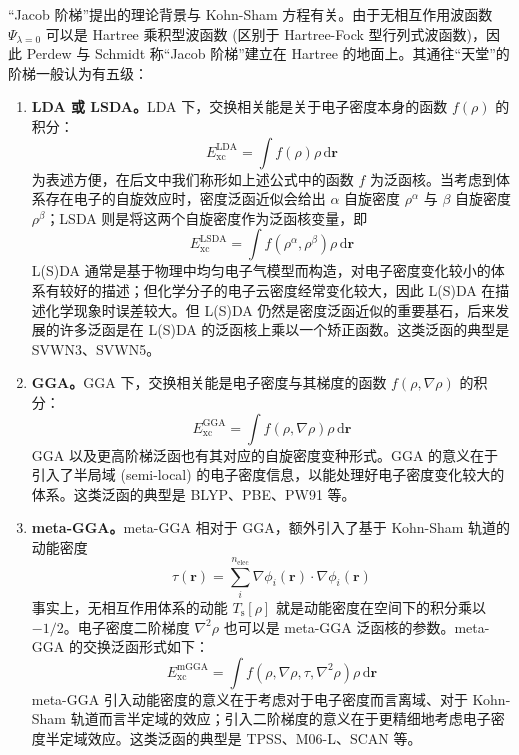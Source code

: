 “Jacob 阶梯”提出的理论背景与 Kohn-Sham 方程有关。由于无相互作用波函数 $\Psi_{\lambda = 0}$ 可以是 Hartree 乘积型波函数 (区别于 Hartree-Fock 型行列式波函数)，因此 Perdew 与 Schmidt 称“Jacob 阶梯”建立在 Hartree 的地面上。其通往“天堂”的阶梯一般认为有五级：
\begin{enumerate}[nosep]
  \item \textbf{LDA 或 LSDA。}LDA 下，交换相关能是关于电子密度本身的函数 $f(\rho)$ 的积分：
  \begin{equation}
    E_\mathrm{xc}^\mathrm{LDA} = \int f(\rho) \rho \, \mathrm{d} \bm{r}
  \end{equation}
  为表述方便，在后文中我们称形如上述公式中的函数 $f$ 为泛函核。当考虑到体系存在电子的自旋效应时，密度泛函近似会给出 $\alpha$ 自旋密度 $\rho^\alpha$ 与 $\beta$ 自旋密度 $\rho^\beta$；LSDA 则是将这两个自旋密度作为泛函核变量，即
  \begin{equation}
    E_\mathrm{xc}^\mathrm{LSDA} = \int f(\rho^\alpha, \rho^\beta) \rho \, \mathrm{d} \bm{r}
  \end{equation}
  L(S)DA 通常是基于物理中均匀电子气模型而构造，对电子密度变化较小的体系有较好的描述；但化学分子的电子云密度经常变化较大，因此 L(S)DA 在描述化学现象时误差较大。但 L(S)DA 仍然是密度泛函近似的重要基石，后来发展的许多泛函是在 L(S)DA 的泛函核上乘以一个矫正函数。这类泛函的典型是 SVWN3\cite{Dirac-Dirac.MPCPS.1930, Bloch-Bloch.ZP.1929, Vosko-Nusair.CJP.1980}、SVWN5\cite{Dirac-Dirac.MPCPS.1930, Bloch-Bloch.ZP.1929, Vosko-Nusair.CJP.1980}。
  
  \item \textbf{GGA。}GGA 下，交换相关能是电子密度与其梯度的函数 $f(\rho, \nabla \rho)$ 的积分：
  \begin{equation}
    E_\mathrm{xc}^\mathrm{GGA} = \int f(\rho, \nabla \rho) \rho \, \mathrm{d} \bm{r}
  \end{equation}
  GGA 以及更高阶梯泛函也有其对应的自旋密度变种形式。GGA 的意义在于引入了半局域 (semi-local) 的电子密度信息，以能处理好电子密度变化较大的体系。这类泛函的典型是 BLYP\cite{Becke-Becke.PRA.1988, Lee-Parr.PRB.1988}、PBE\cite{Perdew-Ernzerhof.PRL.1996}、PW91\cite{Perdew-Fiolhais.PRB.1992} 等。

  \item \textbf{meta-GGA。}meta-GGA 相对于 GGA，额外引入了基于 Kohn-Sham 轨道的动能密度
  \begin{equation*}
    \tau (\bm{r}) = \sum_i^{n_\mathrm{elec}} \nabla \phi_i (\bm{r}) \cdot \nabla \phi_i (\bm{r})
  \end{equation*}
  事实上，无相互作用体系的动能 $T_\mathrm{s} [\rho]$ 就是动能密度在空间下的积分乘以 $-1/2$。电子密度二阶梯度 $\nabla^2 \rho$ 也可以是 meta-GGA 泛函核的参数。meta-GGA 的交换泛函形式如下：
  \begin{equation}
    E_\mathrm{xc}^\mathrm{mGGA} = \int f(\rho, \nabla \rho, \tau, \nabla^2 \rho) \rho \, \mathrm{d} \bm{r}
  \end{equation}
  meta-GGA 引入动能密度的意义在于考虑对于电子密度而言离域、对于 Kohn-Sham 轨道而言半定域的效应；引入二阶梯度的意义在于更精细地考虑电子密度半定域效应。这类泛函的典型是 TPSS\cite{Tao-Scuseria.PRL.2003, Perdew-Scuseria.JCP.2004}、M06-L\cite{Zhao-Truhlar.TCA.2008}、SCAN\cite{Sun-Perdew.PRL.2015} 等。


\end{enumerate}
